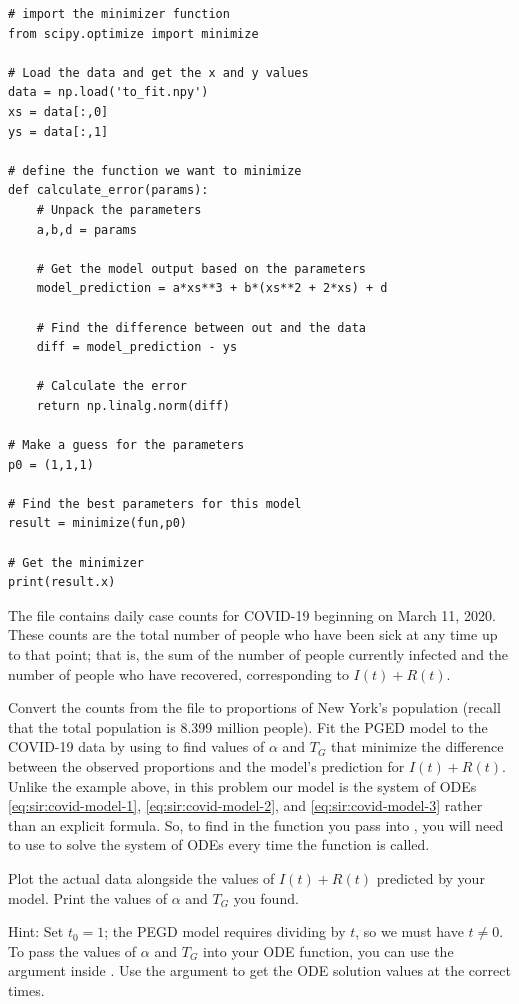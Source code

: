 \begin{lstlisting}
# import the minimizer function
from scipy.optimize import minimize

# Load the data and get the x and y values
data = np.load('to_fit.npy')
xs = data[:,0]
ys = data[:,1]

# define the function we want to minimize
def calculate_error(params):
    # Unpack the parameters
    a,b,d = params

    # Get the model output based on the parameters
    model_prediction = a*xs**3 + b*(xs**2 + 2*xs) + d

    # Find the difference between out and the data
    diff = model_prediction - ys

    # Calculate the error
    return np.linalg.norm(diff)

# Make a guess for the parameters
p0 = (1,1,1)

# Find the best parameters for this model
result = minimize(fun,p0)

# Get the minimizer
print(result.x)
\end{lstlisting}


\begin{problem}\label{sir_nyc-model}
    The file  contains daily case counts for COVID-19 beginning on March 11, 2020.
    These counts are the total number of people who have been sick at any time up to that point; that is, the sum of the number of people currently infected and the number of people who have recovered, corresponding to $I(t)+R(t)$.
    
    Convert the counts from the file to proportions of New York's population (recall that the total population is 8.399 million people).
    Fit the PGED model to the COVID-19 data by using  to find values of $\alpha$ and $T_G$ that minimize the difference between the observed proportions and the model's prediction for $I(t)+R(t)$.
    Unlike the example above, in this problem our model is the system of ODEs \eqref{eq:sir:covid-model-1}, \eqref{eq:sir:covid-model-2}, and \eqref{eq:sir:covid-model-3} rather than an explicit formula.
    So, to find  in the function you pass into , you will need to use  to solve the system of ODEs every time the function is called.
    
    Plot the actual data alongside the values of $I(t)+R(t)$ predicted by your model.
    Print the values of $\alpha$ and $T_G$ you found.

    Hint: Set $t_0=1$; the PEGD model requires dividing by $t$, so we must have $t\ne0$.
    To pass the values of $\alpha$ and $T_G$ into your ODE function, you can use the argument  inside .
    Use the  argument to get the ODE solution values at the correct times.
\end{problem}

